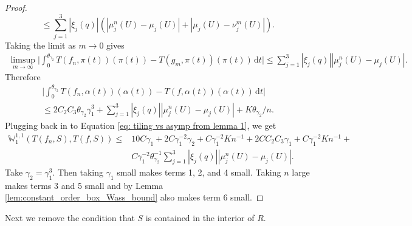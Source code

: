 \documentclass[11pt]{article}
\theoremstyle{remark}
\theoremstyle{definition}
\newcommand{\m}[1]{\mathbb{#1}}
\newcommand{\dd}{\mathrm{d}}
\begin{document}
\begin{proof}
$$        \leq \sum_{j=1}^3 |\xi_j(q)| (|\mu_j^n(U)-\mu_j(U)|+ |\mu_j(U)-\nu_j^m(U)|).
 $$
    Taking the limit as $m\to 0$ gives 
    \begin{align*}
       \limsup_{m\to \infty} \bigg|\int_{0}^{\theta_{\gamma_2}} T(f_n,\pi(t))(\pi(t))- T(g_m,\pi(t))(\pi(t)) \,\dd t \bigg|\leq \sum_{j=1}^3 |\xi_j(q)| |\mu_j^n(U)-\mu_j(U)|.
    \end{align*}
    Therefore 
    \begin{align*}
    \bigg|\int_{0}^{\theta_{\gamma_2}} T(f_n,\alpha(t))(\alpha(t))- T(f,\alpha(t))(\alpha(t))\, \dd t \bigg| \\ \leq 2C_2 C_3 \theta_{\gamma_2} \gamma_1^3 + \sum_{j=1}^3 |\xi_j(q)| |\mu_j^n(U)-\mu_j(U)| + K\theta_{\gamma_2}/n.
    \end{align*}
    Plugging back in to Equation \eqref{eq: tiling vs asymp from lemma 1}, we get 
    \begin{align*}
        \m W_{1}^{1,1}(T(f_n,S), T(f,S)) \leq &10 C \gamma_1 + 2C \gamma_1^{-2} \gamma_2 + C \gamma_1^{-2} K n^{-1} + 2C C_2 C_3 \gamma_1 + C \gamma_1^{-2} K n^{-1} + \\
        &C \gamma_1^{-2} \theta_{\gamma_2}^{-1} \sum_{j=1}^3 |\xi_j(q)||\mu_j^n(U)-\mu_j(U)|.
    \end{align*}
    Take $\gamma_2 = \gamma_1^3$. Then taking $\gamma_1$ small makes terms 1, 2, and 4 small. Taking $n$ large makes terms 3 and 5 small and by Lemma \ref{lem:constant_order_box_Wass_bound} also makes term 6 small. 
\end{proof}

Next we remove the condition that $S$ is contained in the interior of $R$.
\end{document}
